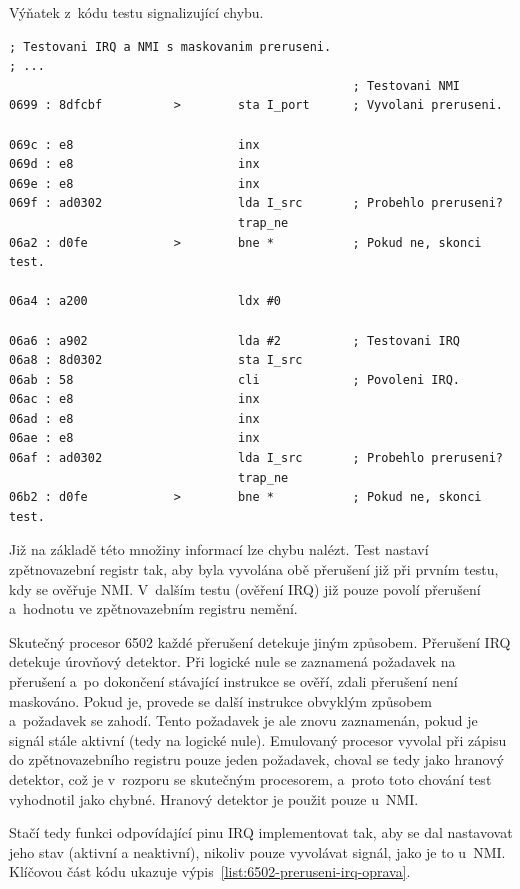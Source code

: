 \begin{listing}[htp!]
	\caption{Výňatek z~kódu testu signalizující chybu.}
	\label{list:6502-test-hledani-chyby}
	\begin{verbatim}
; Testovani IRQ a NMI s maskovanim preruseni.
; ...
												; Testovani NMI
0699 : 8dfcbf          >        sta I_port      ; Vyvolani preruseni.

069c : e8                       inx
069d : e8                       inx
069e : e8                       inx
069f : ad0302                   lda I_src       ; Probehlo preruseni?
                                trap_ne
06a2 : d0fe            >        bne *           ; Pokud ne, skonci test.

06a4 : a200                     ldx #0

06a6 : a902                     lda #2          ; Testovani IRQ
06a8 : 8d0302                   sta I_src
06ab : 58                       cli             ; Povoleni IRQ.
06ac : e8                       inx
06ad : e8                       inx
06ae : e8                       inx
06af : ad0302                   lda I_src       ; Probehlo preruseni?
                                trap_ne
06b2 : d0fe            >        bne *           ; Pokud ne, skonci test.
	\end{verbatim}
\end{listing}

Již na základě této množiny informací lze chybu nalézt. Test nastaví zpětnovazební registr tak, aby byla vyvolána obě přerušení již při prvním testu, kdy se ověřuje NMI. V~dalším testu (ověření IRQ) již pouze povolí přerušení a~hodnotu ve zpětnovazebním registru nemění.

Skutečný procesor 6502 každé přerušení detekuje jiným způsobem. Přerušení IRQ detekuje úrovňový detektor. Při logické nule se zaznamená požadavek na přerušení a~po dokončení stávající instrukce se ověří, zdali přerušení není maskováno. Pokud je, provede se další instrukce obvyklým způsobem a~požadavek se zahodí. Tento požadavek je ale znovu zaznamenán, pokud je signál stále aktivní (tedy na logické nule). Emulovaný procesor vyvolal při zápisu do zpětnovazebního registru pouze jeden požadavek, choval se tedy jako hranový detektor, což je v~rozporu se skutečným procesorem, a~proto toto chování test vyhodnotil jako chybné. Hranový detektor je použit pouze u~NMI.

Stačí tedy funkci odpovídající pinu IRQ implementovat tak, aby se dal nastavovat jeho stav (aktivní a neaktivní), nikoliv pouze vyvolávat signál, jako je to u~NMI. Klíčovou část kódu ukazuje výpis~\ref{list:6502-preruseni-irq-oprava}.

